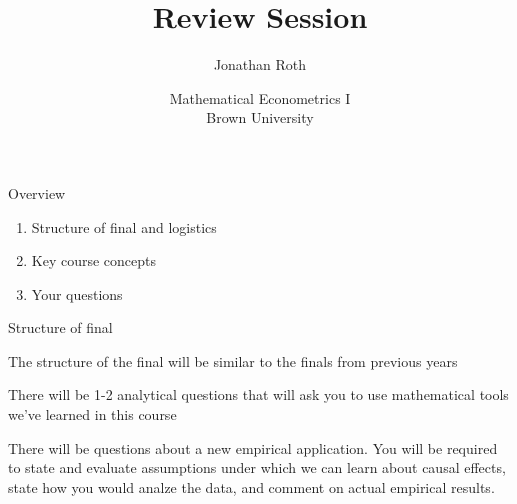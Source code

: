 \documentclass[11pt,english,handout]{beamer}
\newenvironment{wideitemize}{\itemize\addtolength{\itemsep}{10pt}}{\enditemize}
\begin{document}
	
	\begin{frame}[noframenumbering]{}
		\vspace{0.5cm}
		\title[]{Review Session}
		\author{Jonathan Roth}
		\date{Mathematical Econometrics I \\ Brown University\\} 
		\titlepage {\small{}\ }\thispagestyle{empty} \vspace{-30pt}
		
	\end{frame}


\begin{frame}{Overview}
	\begin{enumerate}
		\item 
		Structure of final and logistics
		
		\item
		Key course concepts
		
		\item
		Your questions
	\end{enumerate}
\end{frame}
	
	
\begin{frame}{Structure of final}
	\begin{wideitemize}
		\item
		The structure of the final will be similar to the finals from previous years
		
		\item
		There will be 1-2 analytical questions that will ask you to use mathematical tools we've learned in this course
		
		\item
		There will be questions about a new empirical application. You will be required to state and evaluate assumptions under which we can learn about causal effects, state how you would analze the data, and comment on actual empirical results.
		
	\end{wideitemize}
\end{frame}	
\end{document}

